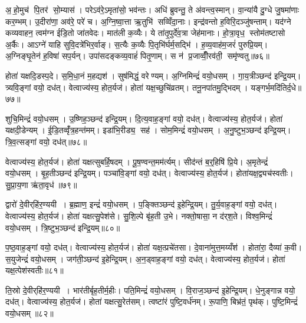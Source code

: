 अ॒हो॒मुच॑ पि॒तर॑ सो॒म्यास॑। परेऽव॑रे॒ऽमृता॑सो॒ भव॑न्तः। अधि॑ ब्रुवन्तु॒ ते अ॑वन्त्व॒स्मान्। वा॒न्या॑यै दु॒ग्धे जु॒षमा॑णाः कर॒म्भम्। उ॒दीरा॑णा॒ अव॑रे॒ परे॑ च। अ॒ग्नि॒ष्वा॒त्ता ऋ॒तुभि॑ सव्विँदा॒नाः। इन्द्र॑वन्तो ह॒विरि॒दञ्जु॑षन्ताम्। यद॑ग्ने कव्यवाहन॒ त्वम॑ग्न ईडि॒तो जा॑तवेदः। मात॑ली क॒व्यैः। ये ता॑तृ॒पुर्दे॑व॒त्रा जेह॑मानाः। हो॒त्रा॒वृध॒ स्तोम॑तष्टासो अ॒र्कैः। आऽग्ने॑ याहि सुवि॒दत्रे॑भिर॒र्वाङ्। स॒त्यैः क॒व्यैः पि॒तृभि॑र्घर्म॒सद्भि॑। ह॒व्य॒वाह॑म॒जरं॑ पुरुप्रि॒यम्। अ॒ग्निङ्घृ॒तेन॑ ह॒विषा॑ सप॒र्यन्। उपा॑सदङ्कव्य॒वाहं॑ पितृ॒णाम्। स न॑ प्र॒जाव्वीँ॒रव॑ती॒ समृ॑ण्वतु॥७६॥\anuvakamend[अन॑ग्निष्वात्ता॒ जेह॑मानाः स॒प्त च॑]

होता॑ यक्षदि॒डस्प॒दे। स॒मि॒धा॒नं म॒हद्यश॑। सुष॑मिद्धं॒ वरेण्यम्। अ॒ग्निमिन्द्रं॑ वयो॒धसम्। गा॒य॒त्रीञ्छन्द॑ इन्द्रि॒यम्। त्र्यवि॒ङ्गां वयो॒ दध॑त्। वेत्वाज्य॑स्य॒ होत॒र्यज॑। होता॑ यक्ष॒च्छुचि॑व्रतम्। तनू॒नपा॑तमु॒द्भिदम्। यङ्गर्भ॒मदि॑तिर्द॒धे॥७७॥

शुचि॒मिन्द्रं॑ वयो॒धसम्। उ॒ष्णिह॒ञ्छन्द॑ इन्द्रि॒यम्। दि॒त्य॒वाह॒ङ्गां वयो॒ दध॑त्। वेत्वाज्य॑स्य॒ होत॒र्यज॑। होता॑ यक्षदी॒डेन्यम्। ई॒डि॒तव्वृँ॑त्र॒हन्त॑मम्। इडा॑भि॒रीड्य॒ सह॑। सोम॒मिन्द्रं॑ वयो॒धसम्। अ॒नु॒ष्टुभ॒ञ्छन्द॑ इन्द्रि॒यम्। त्रि॒व॒त्सङ्गां वयो॒ दध॑त्॥७८॥

वेत्वाज्य॑स्य॒ होत॒र्यज॑। होता॑ यक्षत्सुबर्\mbox{}हि॒षदम्। पू॒ष॒ण्वन्त॒मम॑र्त्यम्। सीद॑न्तं ब॒र्॒हिषि॑ प्रि॒ये। अ॒मृतेन्द्रं॑ वयो॒धसम्। बृ॒ह॒तीञ्छन्द॑ इन्द्रि॒यम्। पञ्चा॑वि॒ङ्गां वयो॒ दध॑त्। वेत्वाज्य॑स्य॒ होत॒र्यज॑। होता॑यक्ष॒द्व्यच॑स्वतीः। सु॒प्रा॒य॒णा ऋ॑ता॒वृध॑॥७९॥

द्वारो॑ दे॒वीर्‌हि॑र॒ण्ययी। ब्र॒ह्माण॒ इन्द्रं॑ वयो॒धसम्। प॒ङ्क्तिञ्छन्द॑ इ॒हेन्द्रि॒यम्। तु॒र्य॒वाह॒ङ्गां वयो॒ दध॑त्। वेत्वाज्य॑स्य॒ होत॒र्यज॑। होता॑ यक्षत्सु॒पेश॑से। सु॒शि॒ल्पे बृ॑ह॒ती उ॒भे। नक्तो॒षासा॒ न द॑र्‌श॒ते। विश्व॒मिन्द्रं॑ वयो॒धसम्। त्रि॒ष्टुभ॒ञ्छन्द॑ इन्द्रि॒यम्॥८०॥

प॒ष्ठ॒वाह॒ङ्गां वयो॒ दध॑त्। वेत्वाज्य॑स्य॒ होत॒र्यज॑। होता॑ यक्ष॒त्प्रचे॑तसा। दे॒वाना॑मुत्त॒मय्यँश॑। होता॑रा॒ दैव्या॑ क॒वी। स॒युजेन्द्रं॑ वयो॒धसम्। जग॑ती॒ञ्छन्द॑ इ॒हेन्द्रि॒यम्। अ॒न॒ड्वाह॒ङ्गां वयो॒ दध॑त्। वेत्वाज्य॑स्य॒ होत॒र्यज॑। होता॑ यक्ष॒त्पेश॑स्वतीः॥८१॥

ति॒स्रो दे॒वीर्‌हि॑र॒ण्ययी। भार॑तीर्बृह॒तीर्म॒हीः। पति॒मिन्द्रं॑ वयो॒धसम्। वि॒राज॒ञ्छन्द॑ इ॒हेन्द्रि॒यम्। धे॒नुङ्गान्न वयो॒ दध॑त्। वेत्वाज्य॑स्य॒ होत॒र्यज॑। होता॑ यक्षत्सु॒रेत॑सम्। त्वष्टा॑रं पुष्टि॒वर्ध॑नम्। रू॒पाणि॒ बिभ्र॑तं॒ पृथ॑क्। पुष्टि॒मिन्द्रं॑ वयो॒धसम्॥८२॥

